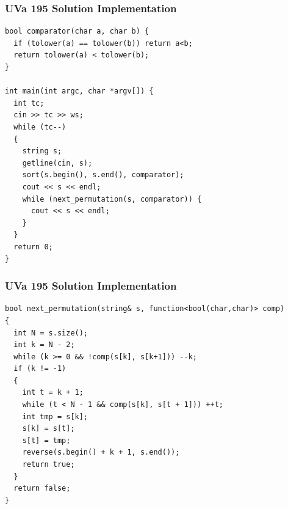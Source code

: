 \documentclass{beamer}
\begin{document}
\begin{frame}[containsverbatim]
\frametitle{UVa 195 Solution Implementation}
\scriptsize

\begin{lstlisting}
bool comparator(char a, char b) {
  if (tolower(a) == tolower(b)) return a<b;
  return tolower(a) < tolower(b);
}

int main(int argc, char *argv[]) {
  int tc;
  cin >> tc >> ws;
  while (tc--)
  {
    string s;
    getline(cin, s);
    sort(s.begin(), s.end(), comparator);
    cout << s << endl;
    while (next_permutation(s, comparator)) {
      cout << s << endl;
    }
  }
  return 0;
}
\end{lstlisting}

\end{frame}

\begin{frame}[containsverbatim]
\frametitle{UVa 195 Solution Implementation}
\scriptsize

\begin{lstlisting}
bool next_permutation(string& s, function<bool(char,char)> comp)
{
  int N = s.size();
  int k = N - 2;
  while (k >= 0 && !comp(s[k], s[k+1])) --k;
  if (k != -1)
  {
    int t = k + 1;
    while (t < N - 1 && comp(s[k], s[t + 1])) ++t;
    int tmp = s[k];
    s[k] = s[t];
    s[t] = tmp;
    reverse(s.begin() + k + 1, s.end());
    return true;
  }
  return false;
}
\end{lstlisting}

\end{frame}
\end{document}
